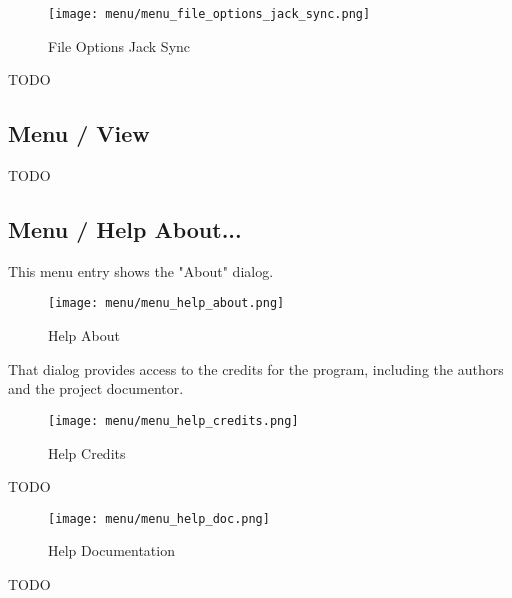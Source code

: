 \begin{figure}[H]
   \centering 
   \texttt{[image: menu/menu\_file\_options\_jack\_sync.png]}
   \caption{File Options Jack Sync}
   \label{fig:seq24_menu_file_options_jack_sync}
\end{figure}

   TODO

\subsection{Menu / View}
\label{subsec:seq24_menu_view}

   TODO

\subsection{Menu / Help About...}
\label{subsec:seq24_menu_about}

   This menu entry shows the "About" dialog.

\begin{figure}[H]
   \centering 
   \texttt{[image: menu/menu\_help\_about.png]}
   \caption{Help About}
   \label{fig:seq24_menu_help_about}
\end{figure}

   That dialog provides access to the credits for the program, including the
   authors and the project documentor.

\begin{figure}[H]
   \centering 
   \texttt{[image: menu/menu\_help\_credits.png]}
   \caption{Help Credits}
   \label{fig:seq24_menu_help_credits}
\end{figure}

   TODO

\begin{figure}[H]
   \centering 
   \texttt{[image: menu/menu\_help\_doc.png]}
   \caption{Help Documentation}
   \label{fig:seq24_menu_help_doc}
\end{figure}

   TODO


